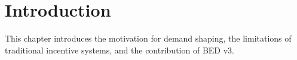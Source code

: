 \chapter{Introduction}

This chapter introduces the motivation for demand shaping, the limitations of
traditional incentive systems, and the contribution of BED v3.
